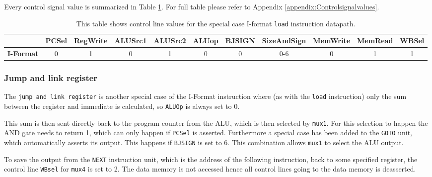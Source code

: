             Every control signal value is summarized in Table \ref{table:LOADFORMAT}. For full table please refer to Appendix \ref{appendix:Controlsignalvalues}.
            
            
            \begin{table}[h!]
                \small
                \hspace{-2.4cm}
                \begin{tabular}{|c||c|c|c|c|c|c|c|c|c|c|}
                	\hline
                	                  & \textbf{PCSel} & \textbf{RegWrite} & \textbf{ALUSrc1} & \textbf{ALUSrc2} & \textbf{ALUop} & \textbf{BJSIGN} & \textbf{SizeAndSign} & \textbf{MemWrite} & \textbf{MemRead} & \textbf{WBSel} \\ \hline\hline
                	\textbf{I-Format} &       0        &         1         &        0         &        1         &      0      &        0        &          0-6           &         0         &        1         &       1        \\ \hline
                \end{tabular}
                \caption{This table shows control line values for the special case I-format \texttt{load} instruction datapath. }
                \label{table:LOADFORMAT}
            \end{table}
        
        \subsubsection{Jump and link register}
            The \texttt{jump and link register} is another special case of the I-Format instruction where (as with the \texttt{load} instruction) only the sum between the register and immediate is calculated, so \texttt{ALUOp} is always set to 0.
            
            This sum is then sent directly back to the program counter from the ALU, which is then selected by \texttt{mux1}. For this selection to happen the AND gate needs to return 1, which can only happen if \texttt{PCSel} is asserted. Furthermore a special case has been added to the \texttt{GOTO} unit, which automatically asserts its output. This happens if \texttt{BJSIGN} is set to 6. This combination allows \texttt{mux1} to select the ALU output.
            
            To save the output from the \texttt{NEXT} instruction unit, which is the address of the following instruction, back to some specified register, the control line \texttt{WBsel} for \texttt{mux4} is set to 2. The data memory is not accessed hence all control lines going to the data memory is deasserted.
            
